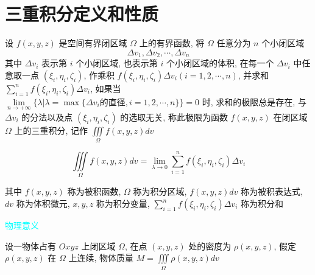 \section{三重积分定义和性质}

\begin{definition}[三重积分]
	设 $f(x, y, z)$ 是空间有界闭区域 $\Omega$ 上的有界函数, 将 $\Omega$ 任意分为 $n$ 个小闭区域
	$$\Delta v_{1}, \Delta v_{2}, \cdots, \Delta v_{n}$$
	其中 $\Delta v_{i}$ 表示第 $i$ 个小闭区域, 也表示第 $i$ 个小闭区域的体积, 在每一个 $\Delta v_{i}$ 中任意取一点 $(\xi_{i}, \eta_{i}, \zeta_{i})$, 作乘积 $f(\xi_{i},\eta_{i},\zeta_{i})\Delta v_{i}(i = 1,2,\cdots,n)$,
	并求和 $\sum_{i=1}^{n}f(\xi_{i},\eta_{i},\zeta_{i})\Delta v_{i}$, 如果当 $\lim\limits_{n \to +\infty}\{\lambda |\lambda = \max\{\Delta v_{i}\text{的直径}, i = 1,2,\cdots,n\}\} = 0$ 时, 求和的极限总是存在, 
	与 $\Delta v_{i}$ 的分法以及点 $(\xi_{i}, \eta_{i}, \zeta_{i})$ 的选取无关, 称此极限为函数 $f(x,y,z)$ 在闭区域 $\Omega$ 上的三重积分, 记作 $\iiint\limits_{\Omega}f(x,y,z)dv$

	$$\iiint\limits_{\Omega}f(x,y,z)dv = \lim\limits_{\lambda \to 0}\sum_{i=1}^{n}f(\xi_{i},\eta_{i},\zeta_{i})\Delta v_{i}$$
	
	其中 $f(x,y,z)$ 称为被积函数, $\Omega$ 称为积分区域, $f(x,y,z)dv$ 称为被积表达式, $dv$ 称为体积微元, $x,y,z$ 称为积分变量, $\sum\limits_{i=1}^{n} f(\xi_{i},\eta_{i},\zeta_{i})\Delta v_{i}$ 称为积分和

	\textcolor{cyan}{物理意义}

	设一物体占有 $Oxyz$ 上闭区域 $\Omega$, 在点 $(x,y,z)$ 处的密度为 $\rho(x,y,z)$, 假定 $\rho(x,y,z)$ 在 $\Omega$ 上连续, 物体质量 $M = \iiint\limits_{\Omega}\rho(x,y,z)dv$
\end{definition}

